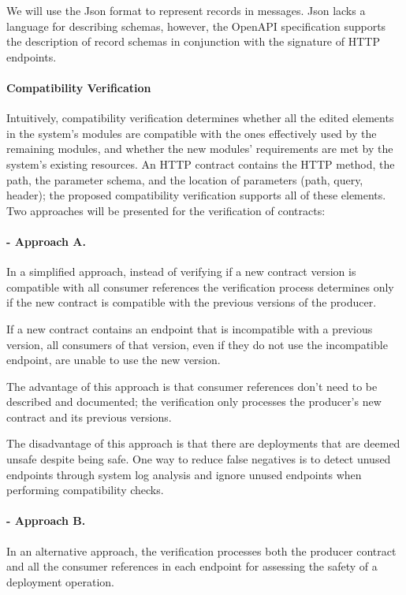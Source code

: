 We will use the Json format to represent records in messages.
Json lacks a language for describing schemas, however, the OpenAPI specification supports the description of record schemas in conjunction with the signature of HTTP endpoints.

\paragraph{Compatibility Verification}

Intuitively, compatibility verification determines whether all the edited elements in the system's modules are compatible with the ones effectively used by the remaining modules,
and whether the new modules' requirements are met by the system's existing resources.
An HTTP contract contains the HTTP method, the path, the parameter schema,
and the location of parameters (path, query, header); the proposed compatibility verification supports all of these elements.
Two approaches will be presented for the verification of contracts:

\paragraph{- Approach A.} In a simplified approach, instead of verifying if a new contract version is compatible with all consumer references
the verification process determines only if the new contract is compatible with the previous versions of the producer.

If a new contract contains an endpoint that is incompatible with a previous version, all consumers of that version,
even if they do not use the incompatible endpoint, are unable to use the new version.

The advantage of this approach is that consumer references don't need to be described and documented;
the verification only processes the producer's new contract and its previous versions.

The disadvantage of this approach is that there are deployments that are deemed unsafe despite being safe.
One way to reduce false negatives is to detect unused endpoints through system log analysis and ignore unused endpoints
when performing compatibility checks.

\paragraph{- Approach B.} In an alternative approach, the verification processes both the producer contract and all the consumer references in each endpoint for
assessing the safety of a deployment operation.

